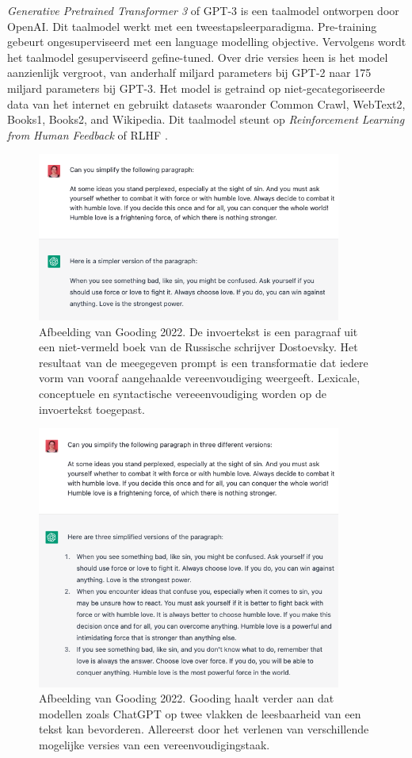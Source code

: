 \textit{Generative Pretrained Transformer 3} of GPT-3 is een taalmodel ontworpen door OpenAI. Dit taalmodel werkt met een tweestapsleerparadigma. Pre-training gebeurt ongesuperviseerd met een language modelling objective. Vervolgens wordt het taalmodel gesuperviseerd gefine-tuned. Over drie versies heen is het model aanzienlijk vergroot, van anderhalf miljard parameters bij GPT-2 naar 175 miljard parameters bij GPT-3. Het model is getraind op niet-gecategoriseerde data van het internet en gebruikt datasets waaronder Common Crawl, WebText2, Books1, Books2, and Wikipedia. Dit taalmodel steunt op \textit{Reinforcement Learning from Human Feedback} of RLHF \autocite{Radford2019, Li2022}.

\begin{figure}[H]
	\includegraphics[width=10cm]{img/chatgpt-example-simplification-gooding.png}
	\caption{Afbeelding van Gooding 2022. De invoertekst is een paragraaf uit een niet-vermeld boek van de Russische schrijver Dostoevsky. Het resultaat van de meegegeven prompt is een transformatie dat iedere vorm van vooraf aangehaalde vereenvoudiging weergeeft. Lexicale, conceptuele en syntactische vereeenvoudiging worden op de invoertekst toegepast.}
\end{figure}

\begin{figure}[H]
	\includegraphics[width=10cm]{img/chatgpt-example-different-versions-gooding.png}
	\caption{Afbeelding van Gooding 2022. Gooding haalt verder aan dat modellen zoals ChatGPT op twee vlakken de leesbaarheid van een tekst kan bevorderen. Allereerst door het verlenen van verschillende mogelijke versies van een vereenvoudigingstaak.}
\end{figure}


